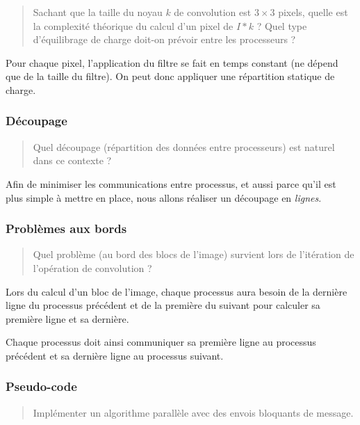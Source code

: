\begin{quotation}
  Sachant que la taille du noyau $k$ de convolution est $3 \times 3$
  pixels, quelle est la complexité théorique du calcul d'un pixel de
  $I * k$ ? Quel type d'équilibrage de charge doit-on prévoir entre
  les processeurs ?
\end{quotation}

Pour chaque pixel, l'application du filtre se fait en temps constant
(ne dépend que de la taille du filtre). On peut donc appliquer une
répartition statique de charge.


\subsubsection{Découpage}

\begin{quotation}
  Quel découpage (répartition des données entre processeurs) est
  naturel dans ce contexte ?
\end{quotation}

Afin de minimiser les communications entre processus, et aussi parce
qu'il est plus simple à mettre en place, nous allons réaliser un
découpage en \emph{lignes}.


\subsubsection{Problèmes aux bords}

\begin{quotation}
  Quel problème (au bord des blocs de l'image) survient lors de
  l'itération de l'opération de convolution ?
\end{quotation}

Lors du calcul d'un bloc de l'image, chaque processus aura besoin de
la dernière ligne du processus précédent et de la première du suivant
pour calculer sa première ligne et sa dernière.

Chaque processus doit ainsi communiquer sa première ligne au processus
précédent et sa dernière ligne au processus suivant.


\subsubsection{Pseudo-code}

\begin{quotation}
  Implémenter un algorithme parallèle avec des envois bloquants de
  message.
\end{quotation}

